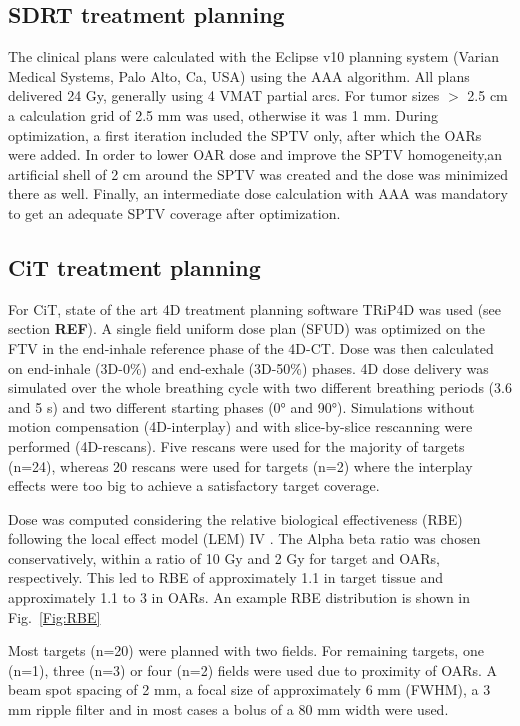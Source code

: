 \documentclass[type=dr, dr=rernat, acm$^3$entcolor=tud7b,colorbacktitle, bigchapter, openright, twoside, 12pt ]{tudthesis}
\begin{document}
\subsection{SDRT treatment planning}
\label{SBRTTP}

The clinical plans were calculated with the Eclipse v10 planning system (Varian Medical Systems, Palo Alto, Ca, USA) using the AAA algorithm. All plans delivered 24 Gy, 
generally using 4 VMAT partial arcs. For tumor sizes $>$ 2.5 cm a calculation grid of 2.5 mm was used, otherwise it was 1 mm. During optimization, a first iteration included the 
SPTV only, after which the OARs were added. In order to lower OAR dose and improve the SPTV homogeneity,an artificial shell of 2 cm around the SPTV was created and the dose was minimized there as well.
Finally, an intermediate dose calculation with AAA was mandatory to get an adequate SPTV coverage after optimization.

\subsection{CiT treatment planning}
\label{CiTTP}

For CiT, state of the art 4D treatment planning software TRiP4D was used (see section \textbf{REF}). A single field uniform dose plan (SFUD) was optimized on the FTV in the end-inhale reference phase of the 4D-CT. 
Dose was then calculated on end-inhale (3D-0\%) and end-exhale (3D-50\%) phases. 4D dose delivery was simulated over the whole breathing cycle with two different breathing periods (3.6 and 5 s) and two different 
starting phases (0° and 90°). Simulations without motion compensation (4D-interplay) and with slice-by-slice rescanning were performed (4D-rescans). Five rescans were used for the majority of targets (n=24), whereas 20 rescans 
were used for targets (n=2) where the interplay effects were too big to achieve a satisfactory target coverage. 

Dose was computed considering the relative biological effectiveness (RBE) following the local effect model (LEM) IV \cite{Elsaesser2010}. The Alpha beta ratio was chosen conservatively, within a ratio of 10 Gy
and 2 Gy for target and OARs, respectively. This led to RBE of approximately 1.1 in target tissue and approximately 1.1 to 3 in OARs. An example RBE distribution is shown in Fig.~\ref{Fig:RBE}

Most targets (n=20) were planned with two fields. For remaining targets, one (n=1), three (n=3) or four (n=2) fields were used due to proximity of OARs.
A beam spot spacing of 2 mm, a focal size of approximately 6 mm (FWHM), a 3 mm ripple filter and in most cases a bolus of a 80 mm width were used.
\end{document}
